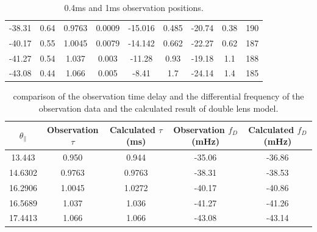 \documentclass{emulateapj}
\begin{document}
\begin{table}
\begin{tabular}{ccccccccc}
-38.31                           & 0.64                               & 0.9763              & 0.0009                             & -15.016  & 0.485                                    & -20.74   & 0.38  &190                                    \\

-40.17                           & 0.55                               & 1.0045              & 0.0079                             & -14.142  & 0.662                                    & -22.27   & 0.62  &187                                   \\

-41.27                           & 0.54                               & 1.037              & 0.003                              & -11.28  & 0.93                                     & -19.18   & 1.1   &188                                   \\

-43.08                           & 0.44                               & 1.066              & 0.005                              & -8.41   & 1.7                                      & -24.14   & 1.4   &185   \\
 \hline                                 
\end{tabular}
\label{table:apex}
\caption{0.4ms and 1ms observation positions.}
\end{table}

\begin{table}
\centering
\begin{tabular}{ccccc}
\hline
$\theta_{\parallel}$ & Observation $\tau$ & Calculated $\tau$(ms) & Observation $f_D$(mHz)        & Calculated $f_D$(mHz) \\ \hline
13.443   &    0.950     & 0.944       & -35.06 & -36.86 \\ 
14.6302  &    0.9763    & 0.9763       & -38.31 & -38.53 \\ 
16.2906  &    1.0045    & 1.0272      & -40.17 & -40.86 \\ 
16.5689  &    1.037     & 1.036        & -41.27 & -41.26 \\ 
17.4413  &    1.066     & 1.066         & -43.08 & -43.14 \\ \hline
\end{tabular}
\label{table:double_lens_compare}
\caption{comparison of the observation time delay and the differential frequency of the observation data and the calculated result of double lens model.}
\end{table}
\end{document}
